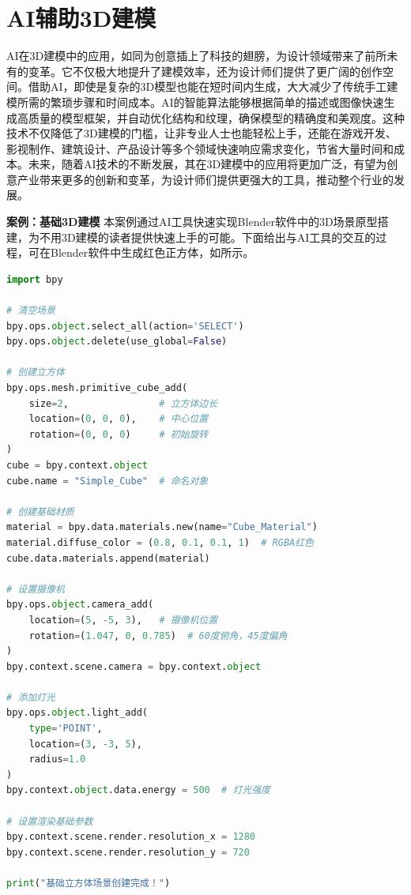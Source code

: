 \section{AI辅助3D建模}


AI在3D建模中的应用，如同为创意插上了科技的翅膀，为设计领域带来了前所未有的变革。它不仅极大地提升了建模效率，还为设计师们提供了更广阔的创作空间。借助AI，即使是复杂的3D模型也能在短时间内生成，大大减少了传统手工建模所需的繁琐步骤和时间成本。AI的智能算法能够根据简单的描述或图像快速生成高质量的模型框架，并自动优化结构和纹理，确保模型的精确度和美观度。这种技术不仅降低了3D建模的门槛，让非专业人士也能轻松上手，还能在游戏开发、影视制作、建筑设计、产品设计等多个领域快速响应需求变化，节省大量时间和成本。未来，随着AI技术的不断发展，其在3D建模中的应用将更加广泛，有望为创意产业带来更多的创新和变革，为设计师们提供更强大的工具，推动整个行业的发展。


\textbf{案例：基础3D建模}
本案例通过AI工具快速实现Blender软件中的3D场景原型搭建，为不用3D建模的读者提供快速上手的可能。下面给出与AI工具的交互的过程，可在Blender软件中生成红色正方体，如所示。



\begin{gptbox} 
\small{ 
\begin{lstlisting}[language=Python] 
import bpy

# 清空场景
bpy.ops.object.select_all(action='SELECT')
bpy.ops.object.delete(use_global=False)

# 创建立方体
bpy.ops.mesh.primitive_cube_add(
    size=2,                # 立方体边长
    location=(0, 0, 0),    # 中心位置
    rotation=(0, 0, 0)     # 初始旋转
)
cube = bpy.context.object
cube.name = "Simple_Cube"  # 命名对象

# 创建基础材质
material = bpy.data.materials.new(name="Cube_Material")
material.diffuse_color = (0.8, 0.1, 0.1, 1)  # RGBA红色
cube.data.materials.append(material)

# 设置摄像机
bpy.ops.object.camera_add(
    location=(5, -5, 3),   # 摄像机位置
    rotation=(1.047, 0, 0.785)  # 60度俯角，45度偏角
)
bpy.context.scene.camera = bpy.context.object

# 添加灯光
bpy.ops.object.light_add(
    type='POINT',
    location=(3, -3, 5),
    radius=1.0
)
bpy.context.object.data.energy = 500  # 灯光强度

# 设置渲染基础参数
bpy.context.scene.render.resolution_x = 1280
bpy.context.scene.render.resolution_y = 720

print("基础立方体场景创建完成！")

\end{lstlisting}
} 
\end{gptbox}

